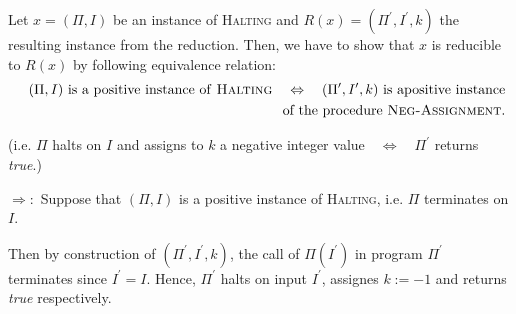 \documentclass[11pt]{article}
\begin{document}
%
\begin{center}
\end{center}%

Let $x=(\Pi ,I)$ be an instance of \textsc{Halting} and $R(x)=(\Pi ^{\prime
},I^{\prime },k)$ the resulting instance from the reduction. Then, we have
to show that $x$ is reducible to $R(x)$ by following equivalence relation:%
\begin{eqnarray*}
&&(\Pi ,I)\text{ is a positive instance of \textsc{Halting}}%
\quad\Leftrightarrow\quad (\Pi ^{\prime },I^{\prime },k)\text{ is apositive
instance} \\
&&\text{of the procedure \textsc{Neg-Assignment}.}
\end{eqnarray*}

(i.e. $\Pi $ halts on $I$ and assigns to $k$ a negative integer value$\quad
\Leftrightarrow\quad \Pi^{\prime }$ returns \textit{true}.)

$\Rightarrow :$ Suppose that $\left( \Pi ,I\right) $ is a positive instance
of \textsc{Halting}, i.e. $\Pi $ terminates on $I$.

Then by construction of $(\Pi ^{\prime },I^{\prime },k)$, the call of $\Pi
(I^{\prime })$ in program $\Pi ^{\prime }$ terminates since $I^{\prime }=I$.
Hence, $\Pi ^{\prime }$ halts on input $I^{\prime }$, assignes $k:=-1$ and
returns \textit{true} respectively.
\end{document}
